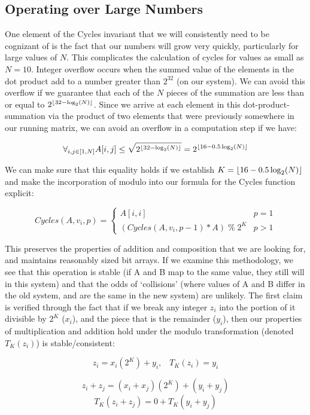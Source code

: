 \subsection{Operating over Large Numbers}
One element of the Cycles invariant that we will consistently need to be cognizant of is the fact that our numbers will grow very quickly, particularly for large values of $N$.
This complicates the calculation of cycles for values as small as $N=10$.
Integer overflow occurs when the summed value of the elements in the dot product add to a number greater than $2^{32}$ (on our system).
We can avoid this overflow if we guarantee that each of the $N$ pieces of the summation are less than or equal to $2^{\lfloor32 - \log_2(N)\rfloor}$.
Since we arrive at each element in this dot-product-summation via the product of two elements that were previously somewhere in our running matrix, we can avoid an overflow in a computation step if we have:

$$ \forall_{i, j \in [1, N]} A[i, j] \leq \sqrt{2^{\lfloor32 - \log_2(N)\rfloor}} = 2^{\lfloor16 - 0.5\log_2(N)\rfloor}$$

We can make sure that this equality holds if we establish $K = \lfloor16 - 0.5\log_2(N)\rfloor$ and make the incorporation of modulo into our formula for the Cycles function explicit:

$$ Cycles(A, v_i, p) = \begin{cases} 
      A[i,i] & p = 1 \\
      (Cycles(A, v_i, p-1) * A) \; \% \; 2^K  & p > 1
\end{cases}$$

This preserves the properties of addition and composition that we are looking for, and maintains reasonably sized bit arrays.
If we examine this methodology, we see that this operation is stable (if A and B map to the same value, they still will in this system) and that the odds of `collisions' (where values of A and B differ in the old system, and are the same in the new system) are unlikely.
The first claim is verified through the fact that if we break any integer $z_i$ into the portion of it divisible by $2^K$ ($x_i$), and the piece that is the remainder ($y_i$), then our properties of multiplication and addition hold under the modulo transformation (denoted $T_K(z_i)$) is stable/consistent:

$$z_i =  x_i(2^K) + y_i , \;\;\;T_K(z_i) = y_i$$

$$z_i + z_j = (x_i + x_j)(2^K) + (y_i + y_j)$$
$$T_K(z_i + z_j) = 0 + T_K(y_i + y_j)$$

